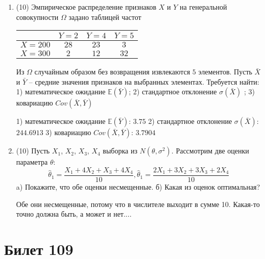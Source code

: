 \documentclass[a4paper,12pt]{article}
\begin{document}
\begin{enumerate}
    

\item


(10) Эмпирическое распределение признаков $X$ и $Y$ на генеральной совокупности $\Omega$ задано таблицей частот  
 
\begin{tabular}{ | c | c | c | c | }
\hline
 & $Y = 2$ & $Y = 4$ & $Y = 5$  \\ \hline
$X = 200$ & $28$ & $23$ & $3$\\ \hline
$X = 300$ & $2$ & $12$ & $32$\\
\hline
\end{tabular}

Из $\Omega$ случайным образом без возвращения извлекаются $5$ элементов. 
Пусть $\bar X$ и $\bar Y$ – средние значения признаков на выбранных элементах. 
Требуется найти: 1) математическое ожидание $\mathbb{E}(\bar Y)$; 2) стандартное отклонение $\sigma(\bar X)$ ; 
3) ковариацию $Cov(\bar X, \bar Y)$




1) математическое ожидание $\mathbb{E}(\bar Y)$: $3.75$ 
2) стандартное отклонение $\sigma(\bar X)$: $244.6913$
3) ковариацию $Cov(\bar X, \bar Y)$: $3.7904$


\item


(10) Пусть $X _{1}$, $X _{2}$, $X _{3}$, $X _{4}$ выборка из $N(\theta, \sigma ^{2})$. Рассмотрим две оценки параметра $\theta$:
\[\hat \theta _{1} = \frac{X _{1} + 4X _{2} + X _{3} + 4X _{4}}{10}, \hat \theta _{1} = \frac{2X _{1} + 3X _{2} + 3X _{3} + 2X _{4}}{10}\]
a) Покажите, что обе оценки несмещенные.
б) Какая из оценок оптимальная?




Обе они несмещенные, потому что в числителе выходит в сумме 10.
Какая-то точно должна быть, а может и нет....



\end{enumerate}

\section{Билет 109}
\end{document}
